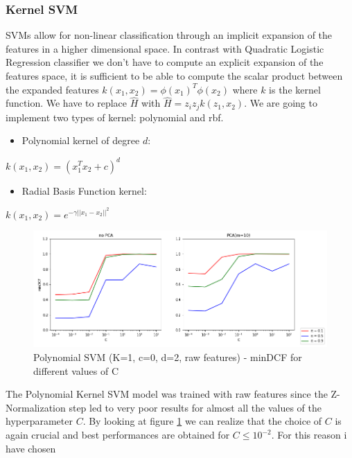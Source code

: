 \documentclass[10pt, a4paper, twocolumn]{article} %
\begin{document}
\subsubsection{Kernel SVM}
SVMs allow for non-linear classification through an implicit expansion of the features in a higher
dimensional space. In contrast with Quadratic Logistic Regression classifier we don't have to compute
an explicit expansion of the features space, it is sufficient to be able to compute the scalar product between
the expanded features $k(x_1, x_2) = \phi(x_1)^T\phi(x_2)$ where $k$ is the kernel function. We have to 
replace $\hat{H}$ with $\hat{H} = z_iz_jk(z_1,x_2)$. We are going to implement two types of kernel: polynomial and rbf.
\begin{itemize}
	\item Polynomial kernel of degree $d$: 
\end{itemize}
		\begin{center}
			$k(x_1, x_2) = (x_1^Tx_2 + c)^d$
		\end{center}
\begin{itemize}
	\item Radial Basis Function kernel:
\end{itemize}
\begin{center}
	$k(x_1, x_2) = e^{-\gamma ||x_1 - x_2||^2}$
\end{center}
\begin{figure}[ht!]
	\includegraphics[width=\linewidth]{./Pictures/FeaturesAnalysis/polysvm.png}
	\caption{Polynomial SVM (K=1, c=0, d=2, raw features) - minDCF for different values of C}
	\label{polysvm} 
\end{figure}
The Polynomial Kernel SVM model was trained with raw features since the Z-Normalization step led to very poor results
for almost all the values of the hyperparameter $C$. 
By looking at figure \ref{polysvm} we can realize that the choice of $C$ is again
crucial and best performances are obtained for $C \le10^{-2}$. For this reason i have chosen 
\end{document}
